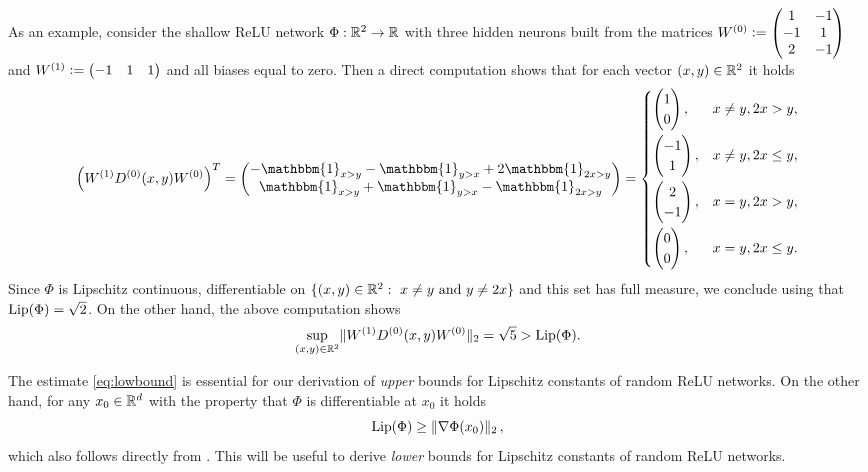 As an example, consider the shallow ReLU network $\Phi:\mathbb{R}^2 \to \mathbb{R}$ with three hidden neurons 
built from the matrices $W^{(0)}\mathrel{\mathop:}= \begin{pmatrix}1 & -1 \\ -1 & 1 \\ 2 & -1\end{pmatrix}$ and $W^{(1)} \mathrel{\mathop:}= \begin{pmatrix} -1&1&1\end{pmatrix}$ and all biases equal to zero. 
Then a direct computation shows that for each vector $(x,y) \in \mathbb{R}^2$ it holds
\begin{equation*}
\left(W^{(1)}D^{(0)}(x,y)W^{(0)}\right)^T
= \begin{pmatrix}
    -\mathbbm{1}_{x>y}- \mathbbm{1}_{y > x} + 2\mathbbm{1}_{2x>y} \\
    \mathbbm{1}_{x>y} + \mathbbm{1}_{y>x}- \mathbbm{1}_{2x>y}\end{pmatrix}
= \begin{cases}
    \begin{pmatrix}1\\0\end{pmatrix},  & x\neq y, 2x>y, \\[0.4cm]
    \begin{pmatrix}-1\\1\end{pmatrix}, & x\neq y, 2x\leq y, \\[0.4cm]
    \begin{pmatrix}2\\-1\end{pmatrix}, & x= y, 2x>y, \\[0.4cm]
    \begin{pmatrix}0\\0\end{pmatrix},  & x= y, 2x\leq y.
\end{cases}
\end{equation*}
Since $\Phi$ is Lipschitz continuous, differentiable on $\{(x,y) \in \mathbb{R}^2: \ x\neq y \ \text{and} \ y\neq 2x\}$ and this set has full measure, we conclude using  that $\operatorname{Lip}(\Phi) = \sqrt{2}$. On the other hand, the above computation shows \begin{equation*}
\underset{(x,y) \in \mathbb{R}^2}{\sup} \Vert W^{(1)}D^{(0)}(x,y)W^{(0)} \Vert_2 = \sqrt{5}>\operatorname{Lip}(\Phi).
\end{equation*}

The estimate \eqref{eq:lowbound} is essential for our derivation of \emph{upper} bounds
for Lipschitz constants of random ReLU networks.
On the other hand, for any $x_0 \in \mathbb{R}^d$ with the property that $\Phi$ is differentiable at $x_0$ 
it holds
\begin{equation}\label{eq:upbound}
  \operatorname{Lip}(\Phi) \geq \Vert \nabla \Phi(x_0) \Vert_2 \, ,
\end{equation}
which also follows directly from . 
This will be useful to derive \emph{lower} bounds for Lipschitz constants of random ReLU networks. 


